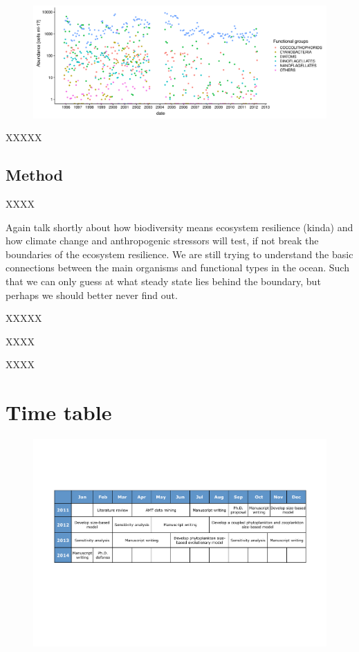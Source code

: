 \begin{figure}[h]
\centering
\includegraphics[trim = 0mm 0mm 0mm 0mm, clip, width=.8\linewidth]{./Chp3-Further/Abundances.pdf}
\end{figure}


XXXXX

\subsection{Method}
XXXX




Again talk shortly about how biodiversity means ecosystem resilience (kinda) and how climate change and anthropogenic stressors will test, if not break the boundaries of the ecosystem resilience. We are still trying to understand the basic connections between the main organisms and functional types in the ocean. Such that we can only guess at what steady state lies behind the boundary, but perhaps we should better never find out.

XXXXX


XXXX

XXXX


\newpage

\section{Time table} 

\begin{figure}[h]
\centering
\includegraphics[trim = 20mm 25mm 20mm 25mm, clip, width=1\linewidth]{./Chp3-Further/Chronogram.pdf}
\end{figure}

